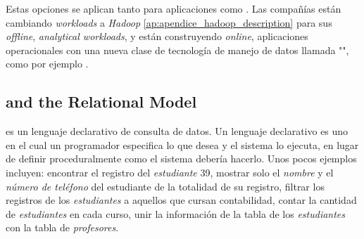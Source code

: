 Estas opciones se aplican tanto para aplicaciones  como . Las compañías están cambiando \textit{workloads} a \textit{Hadoop} \ref{ap:apendice_hadoop_description} para sus \textit{offline}, \textit{analytical workloads}, y están construyendo \textit{online}, aplicaciones operacionales con una nueva clase de tecnología de manejo de datos llamada "", como por ejemplo .

\subsection{ and the Relational Model}

 es un lenguaje declarativo de consulta de datos. Un lenguaje declarativo es uno en el cual un programador especifica lo que desea y el sistema lo ejecuta, en lugar de definir proceduralmente como el sistema debería hacerlo. Unos pocos ejemplos incluyen: encontrar el registro del \textit{estudiante} 39, mostrar solo el \textit{nombre} y el \textit{número de teléfono} del estudiante de la totalidad de su registro, filtrar los registros de los \textit{estudiantes} a aquellos que cursan contabilidad, contar la cantidad de \textit{estudiantes} en cada curso, unir la información de la tabla de los \textit{estudiantes} con la tabla de \textit{profesores}.


